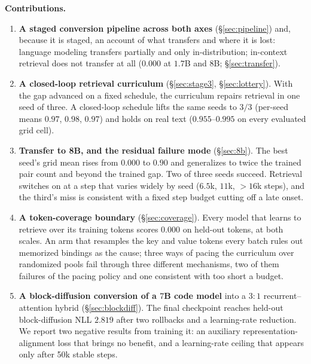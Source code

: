 \documentclass{article}
\begin{document}
\textbf{Contributions.}
\begin{enumerate}[leftmargin=1.4em,itemsep=2pt]
\item \textbf{A staged conversion pipeline across both axes} (\S\ref{sec:pipeline}) and, because it is staged, an account of what transfers and where it is lost: language modeling transfers partially and only in-distribution; in-context retrieval does not transfer at all ($0.000$ at $1.7$B and $8$B; \S\ref{sec:transfer}).
\item \textbf{A closed-loop retrieval curriculum} (\S\ref{sec:stage3}, \S\ref{sec:lottery}). With the gap advanced on a fixed schedule, the curriculum repairs retrieval in one seed of three. A closed-loop schedule lifts the same seeds to $3/3$ (per-seed means $0.97$, $0.98$, $0.97$) and holds on real text ($0.955$--$0.995$ on every evaluated grid cell).
\item \textbf{Transfer to 8B, and the residual failure mode} (\S\ref{sec:8b}). The best seed's grid mean rises from $0.000$ to $0.90$ and generalizes to twice the trained pair count and beyond the trained gap. Two of three seeds succeed. Retrieval switches on at a step that varies widely by seed ($6.5$k, $11$k, ${>}16$k steps), and the third's miss is consistent with a fixed step budget cutting off a late onset.
\item \textbf{A token-coverage boundary} (\S\ref{sec:coverage}). Every model that learns to retrieve over its training tokens scores $0.000$ on held-out tokens, at both scales. An arm that resamples the key and value tokens every batch rules out memorized bindings as the cause; three ways of pacing the curriculum over randomized pools fail through three different mechanisms, two of them failures of the pacing policy and one consistent with too short a budget.
\item \textbf{A block-diffusion conversion of a $7$B code model} into a $3{:}1$ recurrent--attention hybrid (\S\ref{sec:blockdiff}). The final checkpoint reaches held-out block-diffusion NLL $2.819$ after two rollbacks and a learning-rate reduction. We report two negative results from training it: an auxiliary representation-alignment loss that brings no benefit, and a learning-rate ceiling that appears only after 50k stable steps.
\end{enumerate}
\end{document}
